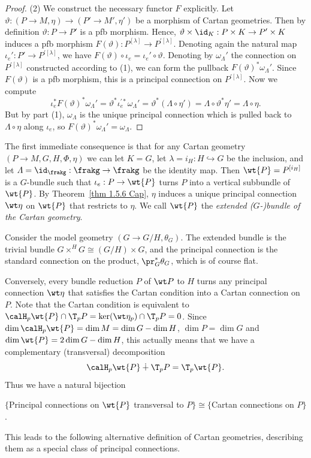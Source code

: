\begin{proof}
    (2) We construct the necessary functor $F$ explicitly. Let $\vartheta:(P\to M,\eta)\to (P'\to M',\eta')$ be a morphism of Cartan geometries. Then by definition $\vartheta:P\to P'$ is a \gls{pfb} morphism. Hence, $\vartheta\times\id_K:P\times K\to P'\times K$ induces a \gls{pfb} morphism $F(\vartheta):P^{[\lambda]}\to P^{\prime[\lambda]}$. Denoting again the natural map $\iota_e':P'\to P^{\prime[\lambda]}$, we have $F(\vartheta)\circ\iota_e=\iota_e'\circ \vartheta$. Denoting by $\omega_\varLambda'$ the connection on $P^{\prime[\lambda]}$ constructed according to (1), we can form the pullback $F(\vartheta)^\ast \omega_\varLambda'$. Since $F(\vartheta)$ is a \gls{pfb} morphism, this is a principal connection on $P^{\prime[\lambda]}$. Now we compute 
    \[\iota_e^\ast F(\vartheta)^\ast\omega_\varLambda'=\vartheta^\ast\iota_e^{\prime\ast}\omega_\varLambda'=\vartheta^\ast(\varLambda\circ\eta')=\varLambda\circ\vartheta^\ast\eta'=\varLambda\circ\eta.\]
    But by part (1), $\omega_\varLambda$ is the unique principal connection which is pulled back to $\varLambda\circ\eta$ along $\iota_e$, so $F(\vartheta)^\ast \omega_\varLambda'=\omega_\varLambda$.
\end{proof}


The first immediate consequence is that for any Cartan geometry $(P\to M,G,H,\Phi,\eta)$ we can let $K=G$, let $\lambda=i_H:H\hookrightarrow G$ be the inclusion, and let $\varLambda=\id_\frakg:\frakg\to\frakg$ be the identity map. Then $\wt{P}=P^{[i_H]}$ is a $G$-bundle such that $\iota_e:P\to \wt{P}$ turns $P$ into a vertical subbundle of $\wt{P}$. By Theorem~\ref{thm 1.5.6 Cap}, $\eta$ induces a unique principal connection $\wt\eta$ on $\wt{P}$ that restricts to $\eta$. We call $\wt{P}$ the \emph{extended ($G$-)bundle of the Cartan geometry}.

\begin{example}
    Consider the model geometry $(G\to G\slash H,\theta_G)$. The extended bundle is the trivial bundle $G\times^H G\cong (G\slash H)\times G$, and the principal connection is the standard connection on the product, $\pr_G^\ast\theta_G$, which is of course flat.
\end{example}

Conversely, every bundle reduction $P$ of $\wt P$ to $H$ turns any principal connection $\wt\eta$ that satisfies the Cartan condition into a Cartan connection on $P$. Note that the Cartan condition is equivalent to $\calH_p \wt{P}\cap \T_p P=\ker(\wt\eta_p)\cap \T_pP=0$. Since $\dim \calH_p \wt{P}=\dim M=\dim G-\dim H$, $\dim P=\dim G$ and $\dim \wt{P}=2\dim G-\dim H$, this actually means that we have a complementary (transversal) decomposition 
\[\calH_p \wt{P}\dotplus \T_p P=\T_p\wt{P}.\] Thus we have a natural bijection 
\begin{center}
    $\{$Principal connections on $\wt{P}$  transversal to $P\}\cong \{$Cartan connections on $P\}$.
\end{center}
This leads to the following alternative definition of Cartan geometries, describing them as a special class of principal connections.

